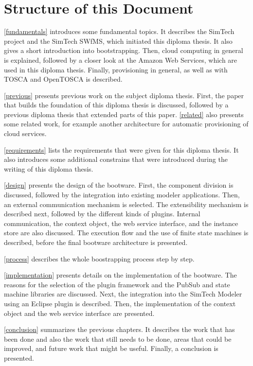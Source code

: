 \section{Structure of this Document}

\autoref{fundamentals} introduces some fundamental topics.
It describes the SimTech project and the SimTech SWfMS, which initiated this diploma thesis.
It also gives a short introduction into bootstrapping.
Then, cloud computing in general is explained, followed by a closer look at the Amazon Web Services, which are used in this diploma thesis.
Finally, provisioning in general, as well as with TOSCA and OpenTOSCA is described.

\autoref{previous} presents previous work on the subject diploma thesis.
First, the paper that builds the foundation of this diploma thesis is discussed, followed by a previous diploma thesis that extended parts of this paper.
\autoref{related} also presents some related work, for example another architecture for automatic provisioning of cloud services.

\autoref{requirements} lists the requirements that were given for this diploma thesis.
It also introduces some additional constrains that were introduced during the writing of this diploma thesis.

\autoref{design} presents the design of the bootware.
First, the component division is discussed, followed by the integration into existing modeler applications.
Then, an external communication mechanism is selected.
The extensibility mechanism is described next, followed by the different kinds of plugins.
Internal communication, the context object, the web service interface, and the instance store are also discussed.
The execution flow and the use of finite state machines is described, before the final bootware architecture is presented.

\autoref{process} describes the whole boostrapping process step by step.

\autoref{implementation} presents details on the implementation of the bootware.
The reasons for the selection of the plugin framework and the PubSub and state machine libraries are discussed.
Next, the integration into the SimTech Modeler using an Eclipse plugin is described.
Then, the implementation of the context object and the web service interface are presented.

\autoref{conclusion} summarizes the previous chapters.
It describes the work that has been done and also the work that still needs to be done, areas that could be improved, and future work that might be useful.
Finally, a conclusion is presented.
